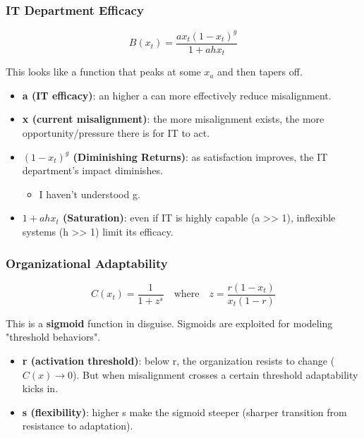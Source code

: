 \documentclass[a4paper, 10pt]{article}
\begin{document}
\subsubsection{IT Department Efficacy}
\begin{equation}
	B(x_t) = \frac{a x_t (1 - x_t)^g}{1 + a h x_t}
\end{equation}

This looks like a function that peaks at some $x_a$ and then tapers off.

\begin{itemize}
	\item \textbf{a (IT efficacy)}: an higher a can more effectively reduce misalignment.
	\item \textbf{x (current misalignment)}: the more misalignment exists, the more opportunity/pressure there is for IT to act.
	\item \textbf{$(1 - x_t)^g$ (Diminishing Returns)}: as satisfaction improves, the IT department's impact diminishes.
	      \begin{itemize}
		      \item I haven't understood g.
	      \end{itemize}
	\item \textbf{$1 + ahx_t$ (Saturation)}: even if IT is highly capable (a >> 1), inflexible systems (h >> 1) limit its efficacy.
\end{itemize}



\subsubsection{Organizational Adaptability}
\begin{equation}
	C(x_t) = \frac{1}{1 + z^s} \quad \text{where} \quad z = \frac{r (1 - x_t)}{x_t (1 - r)}
\end{equation}

This is a \textbf{sigmoid} function in disguise. Sigmoids are exploited for modeling "threshold behaviors".

\begin{itemize}
	\item \textbf{r (activation threshold)}: below r, the organization resists to change ($C(x) \rightarrow 0$). But when misalignment crosses a certain threshold adaptability kicks in.
	\item \textbf{s (flexibility)}: higher s make the sigmoid steeper (sharper transition from resistance to adaptation).
\end{itemize}
\end{document}

